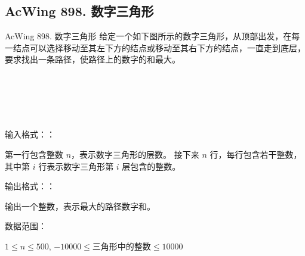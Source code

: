 \subsection{AcWing 898. 数字三角形}
\begin{titledbox}{AcWing 898. 数字三角形}
    给定一个如下图所示的数字三角形，从顶部出发，在每一结点可以选择移动至其左下方的结点或移动至其右下方的结点，一直走到底层，要求找出一条路径，使路径上的数字的和最大。

     \\
     \\
     \\
     \\

    输入格式：：

    第一行包含整数 $n$，表示数字三角形的层数。 接下来 $n$ 行，每行包含若干整数，其中第 $i$ 行表示数字三角形第 $i$ 层包含的整数。

    输出格式：：

    输出一个整数，表示最大的路径数字和。

    数据范围：

    $1 \le n \le 500$, $-10000 \le \text{三角形中的整数} \le 10000$

    \begin{inputblock}
         \\
         \\
         \\
         \\
         \\
    \end{inputblock}
    \begin{outputblock}
    \end{outputblock}
\end{titledbox}

